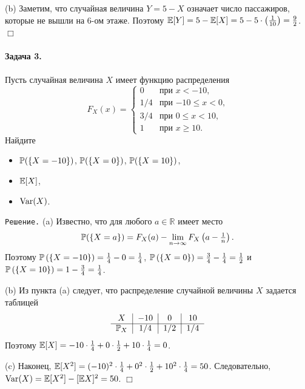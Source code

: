 \documentclass[12pt, a4paper]{article}\usepackage[]{graphicx}\usepackage[]{color}
\begin{document}
				(b) Заметим, что случайная величина $Y = 5 - X$ означает число пассажиров, которые не вышли на 6-ом этаже. Поэтому $\E[Y] = 5 - \E[X] = 5 - 5\cdot\left(\tfrac{1}{10}\right) = \tfrac{9}{2}$. $\Box$
				\paragraph{Задача 3.}
				Пусть случайная величина $X$ имеет функцию распределения
				\[
				F_X(x) =          \begin{cases}
				0     &   \text{при $x < -10$,} \\
				1/4   &   \text{при $-10 \leq x < 0$,} \\
				3/4   &   \text{при $0 \leq x < 10$,} \\
				1     &   \text{при $x \geq 10$.}
				\end{cases}
				\]
				Найдите
				\begin{itemize}
					\item[(a)] $\P(\{X=-10\})$, $\P(\{X=0\})$, $\P(\{X=10\})$,
					\item[(b)] $\E[X]$,
					\item[(c)] $\Var(X)$.
				\end{itemize}

				\verb"Решение." (a) Известно, что для любого $a \in \mathbb{R}$ имеет место
				\[
				\P(\{X=a\}) = F_X(a) - \lim_{n \rightarrow \infty}F_X\left(a-\tfrac{1}{n}\right) \text{.}
				\]
				Поэтому $\P\left(\{X=-10\}\right) = \frac{1}{4} - 0 = \frac{1}{4}$, $\P\left(\{X=0\}\right) = \frac{3}{4} - \frac{1}{4} = \frac{1}{2}$ и $\P\left(\{X=10\}\right) = 1 - \frac{3}{4} = \frac{1}{4}$.

				(b) Из пункта (a) следует, что распределение случайной величины $X$ задается таблицей
				\[
				\begin{tabular}{c|c|c|c}
				$X$             & $-10$   & $0$     & $10$ \\ \cline{1-4}
				$\P_X$  & $1/4$   & $1/2$   & $1/4$ \\
				\end{tabular}
				\]
				Поэтому $\E[X] = -10 \cdot \frac{1}{4} + 0 \cdot \frac{1}{2} + 10 \cdot \frac{1}{4} = 0$.

				(c) Наконец, $\E[X^2] = (-10)^2 \cdot \frac{1}{4} + 0^2 \cdot \frac{1}{2} + 10^2 \cdot \frac{1}{4} = 50$. Следовательно, $\Var(X) = \E[X^2] - [\E X]^2 = 50$. $\Box$
\end{document}
